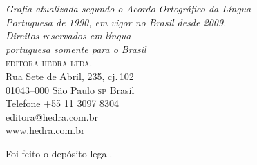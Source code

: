 \vfill

\textit{Grafia atualizada segundo o Acordo Ortográfico da Língua\\
Portuguesa de 1990, em vigor no Brasil desde 2009.}\\

\textit{Direitos reservados em língua\\
portuguesa somente para o Brasil}\\

\textsc{editora hedra ltda.}\\
Rua Sete de Abril, 235, cj.\,102\\
01043--000 São Paulo \textsc{sp} Brasil\\
Telefone +55 11 3097 8304\\\smallskip
editora@hedra.com.br\\
www.hedra.com.br\\
\bigskip

Foi feito o depósito legal.

\endgroup
\pagebreak
